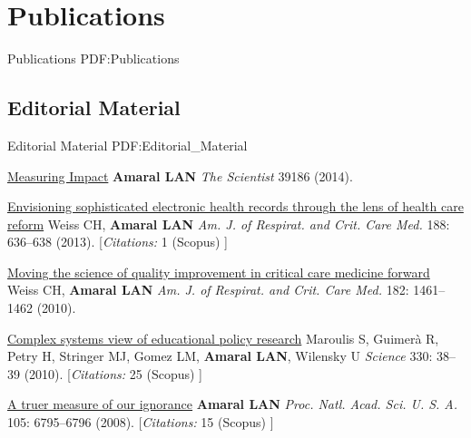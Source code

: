 \section
{Publications}
{Publications}
{PDF:Publications}

\subsection
{Editorial Material}
{Editorial Material}
{PDF:Editorial_Material}

\GapNoBreak
\NumberedItem{\makebox[0.8cm][r]{[11]}}
\href{False}
{Measuring Impact}
\newline
{\textbf{Amaral LAN}}
\newline
\textit{The Scientist}
39186 (2014).
\newline
\Gap
~
\Gap

\NumberedItem{\makebox[0.8cm][r]{[10]}}
\href{/people/amaral/envisioning-sophisticated-electronic-health-records-through-lens-health-care-reform}
{Envisioning sophisticated electronic health records through the lens of health care reform}
\newline
Weiss CH, {\textbf{Amaral LAN}}
\newline
\textit{Am. J. of Respirat. and Crit. Care Med.}
    188:
636--638 (2013).
    [{\em{Citations:}}  1 (Scopus) ]
\newline
\Gap
~
\Gap

\NumberedItem{\makebox[0.8cm][r]{[9]}}
\href{False}
{Moving the science of quality improvement in critical care medicine forward}
\newline
Weiss CH, {\textbf{Amaral LAN}}
\newline
\textit{Am. J. of Respirat. and Crit. Care Med.}
    182:
1461--1462  (2010).
\newline
\Gap
~
\Gap

\NumberedItem{\makebox[0.8cm][r]{[8]}}
\href{/people/amaral/complex-systems-view-educational-policy-research}
{Complex systems view of educational policy research}
\newline
Maroulis S, Guimer\`a R, Petry H, Stringer MJ, Gomez LM, {\textbf{Amaral LAN}}, Wilensky U
\newline
\textit{Science}
    330:
38--39 (2010).
    [{\em{Citations:}}  25 (Scopus) ]
\newline
\Gap
~
\Gap

\NumberedItem{\makebox[0.8cm][r]{[7]}}
\href{/people/amaral/a-truer-measure-of-our-ignorance}
{A truer measure of our ignorance}
\newline
{\textbf{Amaral LAN}}
\newline
\textit{Proc. Natl. Acad. Sci. U. S. A.}
    105:
6795--6796 (2008).
    [{\em{Citations:}}  15 (Scopus) ]
\newline
\Gap
~
\Gap

